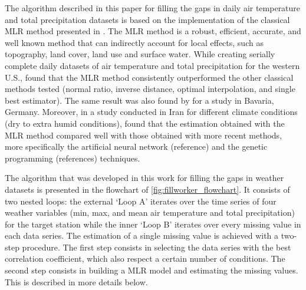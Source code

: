 \documentclass[ARTICLETHERMIC.tex]{subfiles}
\begin{document}
The algorithm described in this paper for filling the gaps in daily air temperature and total precipitation datasets is based on the implementation of the classical MLR method presented in \cite{eischeid_creating_2000}. The MLR method is a robust, efficient, accurate, and well known method that can indirectly account for local effects, such as topography, land cover, land use and surface water. While creating serially complete daily datasets of air temperature and total precipitation for the western U.S., \cite{eischeid_creating_2000} found that the MLR method consistently outperformed the other classical methods tested (normal ratio, inverse distance, optimal interpolation, and single best estimator). The same result was also found by \cite{xia_forest_1999} for a study in Bavaria, Germany. Moreover, in a study conducted in Iran for different climate conditions (dry to extra humid conditions), \cite{kashani_evaluation_2011} found that the estimation obtained with the MLR method compared well with those obtained with more recent methods, more specifically the artificial neural network (reference) and the genetic programming (references) techniques.

The algorithm that was developed in this work for filling the gaps in weather datasets is presented in the flowchart of \cref{fig:fillworker_flowchart}. It consists of two nested loops: the external `Loop A' iterates over the time series of four weather variables (min, max, and mean air temperature and total precipitation) for the target station while the inner `Loop B' iterates over every missing value in each data series. The estimation of a single missing value is achieved with a two-step procedure. The first step consists in selecting the data series with the best correlation coefficient, which also respect a certain number of conditions. The second step consists in building a MLR model and estimating the missing values. This is described in more details below.
\end{document}
